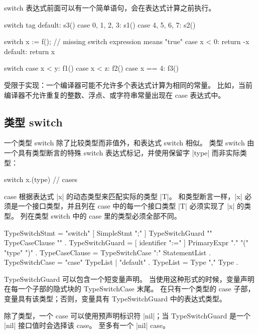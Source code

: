 switch 表达式前面可以有一个简单语句，会在表达式计算之前执行。
\begin{golang}
switch tag {
default: s3()
case 0, 1, 2, 3: s1()
case 4, 5, 6, 7: s2()
}

switch x := f(); {  // missing switch expression means "true"
case x < 0: return -x
default: return x
}

switch {
case x < y: f1()
case x < z: f2()
case x == 4: f3()
}
\end{golang}

受限于实现：一个编译器可能不允许多个表达式计算为相同的常量。
比如，当前编译器不允许重复的整数、浮点、或字符串常量出现在 case 表达式中。

\subsection{类型 switch}
一个类型 switch 除了比较类型而非值外，和表达式 switch 相似。
类型 switch 由一个具有类型断言的特殊 switch 表达式标记，并使用保留字 \code|type| 而非实际类型：
\begin{golang}
switch x.(type) {
// cases
}
\end{golang}
case 根据表达式 \code|x| 的动态类型来匹配实际的类型 \code|T|。
和类型断言一样，\code|x| 必须是一个接口类型，并且列在 case 中的每一个接口类型 \code|T| 必须实现了 \code|x| 的类型。
列在类型 switch 中的 case 里的类型必须全部不同。
\begin{EBNF}
TypeSwitchStmt  = "switch" [ SimpleStmt ";" ] TypeSwitchGuard "{" { TypeCaseClause } "}" .
TypeSwitchGuard = [ identifier ":=" ] PrimaryExpr "." "(" "type" ")" .
TypeCaseClause  = TypeSwitchCase ":" StatementList .
TypeSwitchCase  = "case" TypeList | "default" .
TypeList        = Type { "," Type } .
\end{EBNF}

TypeSwitchGuard 可以包含一个短变量声明。
当使用这种形式的时候，变量声明在每一个子部的隐式块的 TypeSwitchCase 末尾。
在只有一个类型的 case 子部，变量具有该类型；否则，变量具有 TypeSwitchGuard 中的表达式类型。

除了类型，一个 case 可以使用预声明标识符 \code|nil|；当 TypeSwitchGuard 是一个 \code|nil| 接口值时会选择该 case。
至多有一个 \code|nil| case。

